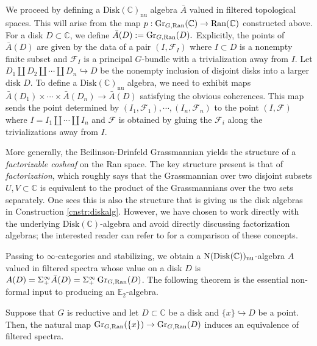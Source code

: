 \begin{cnstr}\label{cnstr:diskalg}
We proceed by defining a $\mathrm{Disk}(\mathbb{C})_{\mathrm{nu}}$ algebra $\bar{A}$ valued in filtered topological spaces.  This will arise from the map $p:\operatorname{\mathrm{Gr}}_{G,\operatorname{\mathrm{Ran}}}(\mathbb{C}) \to \operatorname{\mathrm{Ran}}(\mathbb{C})$ constructed above.  For a disk $D\subset \mathbb{C}$, we define $\bar{A}(D) := \operatorname{\mathrm{Gr}}_{G,\operatorname{\mathrm{Ran}}}(D).$  Explicitly, the points of $\bar{A}(D)$ are given by the data of a pair $(I, \mathcal{F}_I)$ where $I\subset D$ is a nonempty finite subset and $\mathcal{F}_I$ is a principal $G$-bundle with a trivialization away from $I$.  Let $D_1 \coprod D_2\coprod \cdots \coprod D_n \hookrightarrow D$ be the nonempty inclusion of disjoint disks into a larger disk $D$.  To define a $\mathrm{Disk}(\mathbb{C})_{\mathrm{nu}}$ algebra, we need to exhibit maps $\bar{A}(D_1)\times \cdots \times \bar{A}(D_n) \to \bar{A}(D)$ satisfying the obvious coherences.  %
This map sends the point determined by $(I_1, \mathcal{F}_1), \cdots, (I_n, \mathcal{F}_n)$ to the point $(I, \mathcal{F})$ where $I= I_1 \coprod \cdots \coprod I_n$ and $\mathcal{F}$ is obtained by gluing the $\mathcal{F}_i$ along the trivializations away from $I$.  
\end{cnstr}
\begin{rmk}
More generally, the Beilinson-Drinfeld Grassmannian yields the structure of a \emph{factorizable cosheaf} on the Ran space.  The key structure present is that of \emph{factorization}, which roughly says that the Grassmannian over two disjoint subsets $U,V\subset \mathbb{C}$ is equivalent to the product of the Grassmannians over the two sets separately.  One sees this is also the structure that is giving us the disk algebras in Construction \ref{cnstr:diskalg}.  However, we have chosen to work directly with the underlying $\mathrm{Disk}(\mathbb{C})$-algebra and avoid directly discussing factorization algebras; the interested reader can refer to \cite[\S 5.5.4.10]{HA} for a comparison of these concepts.  
\end{rmk}

Passing to $\infty$-categories and stabilizing, we obtain a $\operatorname{\mathrm{N}}(\mathrm{Disk}(\mathbb{C}))_{\mathrm{nu}}$-algebra $A$ valued in filtered spectra whose value on a disk $D$ is $A(D) = \Sigma^{\infty}_+ \bar{A}(D) = \Sigma^{\infty}_+ \operatorname{\mathrm{Gr}}_{G,\operatorname{\mathrm{Ran}}}(D)$.  The following theorem is the essential non-formal input to producing an $\mathbb{E}_2$-algebra.  

\begin{prop}\label{prop:diskequiv}
Suppose that $G$ is reductive and let $D\subset \mathbb{C}$ be a disk and $\{x \} \hookrightarrow D$ be a point.  Then, the natural map $\operatorname{\mathrm{Gr}}_{G,\operatorname{\mathrm{Ran}}}(\{x\}) \to \operatorname{\mathrm{Gr}}_{G,\operatorname{\mathrm{Ran}}}(D)$ induces an equivalence of filtered spectra.  
\end{prop}

